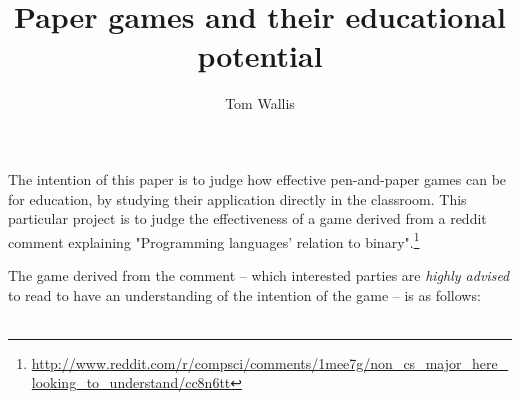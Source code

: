\documentclass[a4paper]{article}
\title{Paper games and their educational potential}
\author{Tom Wallis}
\begin{document}
\maketitle

The intention of this paper is to judge how effective pen-and-paper games can be for education, by studying their application directly in the classroom. 
This particular project is to judge the effectiveness of a game derived from a reddit comment explaining "Programming languages' relation to binary".\footnote{\url{http://www.reddit.com/r/compsci/comments/1mee7g/non_cs_major_here_looking_to_understand/cc8n6tt}}

The game derived from the comment -- which interested parties are \emph{highly advised} to read to have an understanding of the intention of the game -- is as follows: \\
\\
\end{document}
